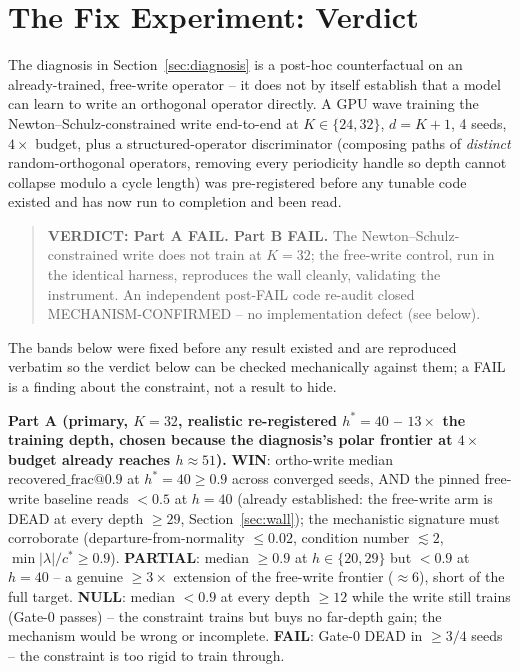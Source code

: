 \section{The Fix Experiment: Verdict}
\label{sec:pending}

The diagnosis in Section~\ref{sec:diagnosis} is a post-hoc counterfactual
on an already-trained, free-write operator -- it does not by itself
establish that a model can learn to write an orthogonal operator
directly. A GPU wave training the Newton--Schulz-constrained write
end-to-end at $K \in \{24, 32\}$, $d{=}K{+}1$, 4 seeds, $4\times$ budget,
plus a structured-operator discriminator (composing paths of
\emph{distinct} random-orthogonal operators, removing every periodicity
handle so depth cannot collapse modulo a cycle length) was pre-registered
before any tunable code existed and has now run to completion and been
read.

\begin{quote}
\textbf{VERDICT: Part A FAIL. Part B FAIL.} The Newton--Schulz-constrained
write does not train at $K{=}32$; the free-write control, run in the
identical harness, reproduces the wall cleanly, validating the
instrument. An independent post-FAIL code re-audit closed
MECHANISM-CONFIRMED -- no implementation defect (see below).
\end{quote}

The bands below were fixed before any result existed and are reproduced
verbatim so the verdict below can be checked mechanically against them; a
FAIL is a finding about the constraint, not a result to hide.

\textbf{Part A (primary, $K{=}32$, realistic re-registered $h^\ast{=}40$
-- $13\times$ the training depth, chosen because the diagnosis's polar
frontier at $4\times$ budget already reaches $h\approx 51$).}
\textbf{WIN}: ortho-write median $\mathrm{recovered\_frac@0.9}$ at
$h^\ast{=}40 \geq 0.9$ across converged seeds, AND the pinned free-write
baseline reads $< 0.5$ at $h{=}40$ (already established: the free-write
arm is DEAD at every depth $\geq 29$, Section~\ref{sec:wall}); the
mechanistic signature must corroborate (departure-from-normality
$\leq 0.02$, condition number $\lesssim 2$, $\min|\lambda|/c^\ast \geq
0.9$). \textbf{PARTIAL}: median $\geq 0.9$ at $h \in \{20, 29\}$ but $<0.9$
at $h{=}40$ -- a genuine $\geq 3\times$ extension of the free-write
frontier ($\approx 6$), short of the full target. \textbf{NULL}: median
$< 0.9$ at every depth $\geq 12$ while the write still trains (Gate-0
passes) -- the constraint trains but buys no far-depth gain; the mechanism
would be wrong or incomplete. \textbf{FAIL}: Gate-0 DEAD in $\geq 3/4$
seeds -- the constraint is too rigid to train through.

